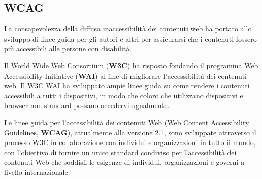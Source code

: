 \subsection{WCAG}
La consapevolezza della diffusa inaccessibilità dei contenuti web ha portato  allo sviluppo di linee guida per gli autori e altri per assicurarsi che i contenuti fossero più accessibili alle persone con disabilità. 

Il World Wide Web Consortium (\textbf{W3C}) ha risposto fondando il programma Web Accessibility Initiative (\textbf{WAI}) al fine di migliorare l'accessibilità dei contenuti web. Il W3C WAI ha sviluppato ampie linee guida su come rendere i contenuti accessibili a tutti i dispositivi, in modo che coloro che utilizzano dispositivi e browser non-standard possano accedervi ugualmente.

Le linee guida per l'accessibilità dei contenuti Web (Web Content Accessibility Guidelines, \textbf{WCAG}), attualmente alla versione 2.1, sono sviluppate attraverso il processo W3C in collaborazione con individui e organizzazioni in tutto il mondo, con l'obiettivo di fornire un unico standard condiviso per l'accessibilità dei contenuti Web che soddisfi le esigenze di individui, organizzazioni e governi a livello internazionale\cite{wcag}.

